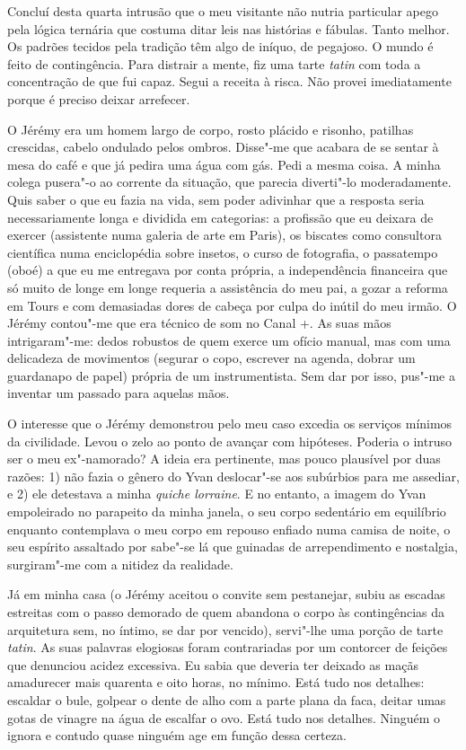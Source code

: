 Concluí desta quarta intrusão que o meu visitante não nutria particular
apego pela lógica ternária que costuma ditar leis nas histórias e
fábulas. Tanto melhor. Os padrões tecidos pela tradição têm algo de
iníquo, de pegajoso. O mundo é feito de contingência. Para distrair a
mente, fiz uma tarte \emph{tatin }com toda a concentração de que fui
capaz. Segui a receita à risca. Não provei imediatamente porque é
preciso deixar arrefecer.

O Jérémy era um homem largo de corpo, rosto plácido e risonho, patilhas
crescidas, cabelo ondulado pelos ombros. Disse"-me que acabara de se
sentar à mesa do café e que já pedira uma água com gás. Pedi a mesma
coisa. A minha colega pusera"-o ao corrente da situação, que parecia
diverti"-lo moderadamente. Quis saber o que eu fazia na vida, sem poder
adivinhar que a resposta seria necessariamente longa e dividida em
categorias: a profissão que eu deixara de exercer (assistente numa
galeria de arte em Paris), os biscates como consultora científica numa
enciclopédia sobre insetos, o curso de fotografia, o passatempo
(oboé) a que eu me entregava por conta própria, a independência
financeira que só muito de longe em longe requeria a assistência do meu
pai, a gozar a reforma em Tours e com demasiadas dores de cabeça por
culpa do inútil
do meu irmão. O Jérémy contou"-me que era técnico de som no Canal +. As
suas mãos intrigaram"-me: dedos robustos de quem exerce um ofício manual,
mas com uma delicadeza de movimentos (segurar o copo, escrever na
agenda, dobrar um guardanapo de papel) própria de um instrumentista. Sem
dar por isso, pus"-me a inventar um passado para aquelas mãos.

O interesse que o Jérémy demonstrou pelo meu caso excedia os serviços
mínimos da civilidade. Levou o zelo ao ponto de avançar com hipóteses.
Poderia o intruso ser o meu ex"-namorado? A ideia era pertinente, mas pouco plausível por duas razões:
1) não fazia o gênero do Yvan deslocar"-se aos subúrbios para me
assediar, e 2) ele detestava a minha \emph{quiche lorraine}. E no
entanto, a imagem do Yvan empoleirado no parapeito da minha janela, o
seu corpo sedentário em equilíbrio enquanto contemplava o meu corpo em
repouso enfiado numa camisa de noite, o seu espírito assaltado por
sabe"-se lá que guinadas de arrependimento e nostalgia, surgiram"-me com a
nitidez da realidade.

Já em minha casa (o Jérémy aceitou o convite sem pestanejar, subiu as
escadas estreitas com o passo demorado de quem abandona o corpo às
contingências da arquitetura sem, no íntimo, se dar por vencido),
servi"-lhe uma porção de tarte \emph{tatin}. As suas palavras elogiosas
foram contrariadas por um contorcer de feições que denunciou acidez
excessiva. Eu sabia que deveria ter deixado as maçãs amadurecer mais
quarenta e oito horas, no mínimo. Está tudo nos detalhes: escaldar o
bule, golpear o dente de alho com a parte plana da faca, deitar umas
gotas de vinagre na água de escalfar o ovo. Está tudo nos detalhes.
Ninguém o ignora e contudo quase ninguém age em função dessa certeza.

